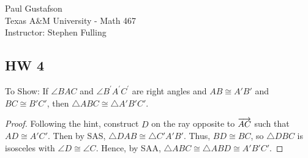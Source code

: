 \documentclass{article}
\begin{document}
\noindent Paul Gustafson\\
\noindent Texas A\&M University - Math 467\\ 
\noindent Instructor: Stephen Fulling

\subsection*{HW 4}
 To Show: If $\angle BAC$ and $\angle B^\prime A^\prime C^\prime$ are right angles and $AB \cong A'B'$ and $BC \cong B'C'$, then $\triangle ABC \cong \triangle A'B'C'$.
\begin{proof}
Following the hint, construct $D$ on the ray opposite to $\overrightarrow{AC}$ such that $AD \cong A'C'$.  Then by SAS, $\triangle DAB \cong \triangle C'A'B'$. Thus, $BD \cong BC$, so $\triangle DBC$ is isosceles with $\angle D \cong \angle C$.  Hence, by SAA, $\triangle ABC \cong \triangle ABD \cong A'B'C'$.
\end{proof}


\end{document}
